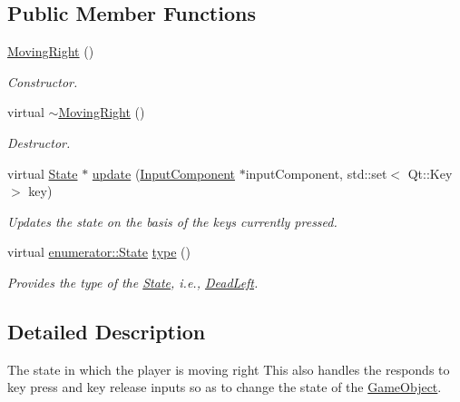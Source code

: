 \subsection*{Public Member Functions}
\begin{DoxyCompactItemize}
\item 
\hypertarget{classMovingRight_a7e0aedcb305334cb740216e8ff5bf9cc}{\hyperlink{classMovingRight_a7e0aedcb305334cb740216e8ff5bf9cc}{Moving\-Right} ()}\label{classMovingRight_a7e0aedcb305334cb740216e8ff5bf9cc}

\begin{DoxyCompactList}\small\item\em Constructor. \end{DoxyCompactList}\item 
\hypertarget{classMovingRight_a9558cd656fb789be52081d7798ca3bc4}{virtual \hyperlink{classMovingRight_a9558cd656fb789be52081d7798ca3bc4}{$\sim$\-Moving\-Right} ()}\label{classMovingRight_a9558cd656fb789be52081d7798ca3bc4}

\begin{DoxyCompactList}\small\item\em Destructor. \end{DoxyCompactList}\item 
virtual \hyperlink{classState}{State} $\ast$ \hyperlink{classMovingRight_aa3ccaf974ea8137e77a26cb3738345c1}{update} (\hyperlink{classInputComponent}{Input\-Component} $\ast$input\-Component, std\-::set$<$ Qt\-::\-Key $>$ key)
\begin{DoxyCompactList}\small\item\em Updates the state on the basis of the keys currently pressed. \end{DoxyCompactList}\item 
virtual \hyperlink{namespaceenumerator_a5fc7b342c2c633e1037b07cea237a222}{enumerator\-::\-State} \hyperlink{classMovingRight_a9d8e60b64a11346a518e222ae36366ca}{type} ()
\begin{DoxyCompactList}\small\item\em Provides the type of the \hyperlink{classState}{State}, i.\-e., \hyperlink{classDeadLeft}{Dead\-Left}. \end{DoxyCompactList}\end{DoxyCompactItemize}


\subsection{Detailed Description}
The state in which the player is moving right This also handles the responds to key press and key release inputs so as to change the state of the \hyperlink{classGameObject}{Game\-Object}. 

